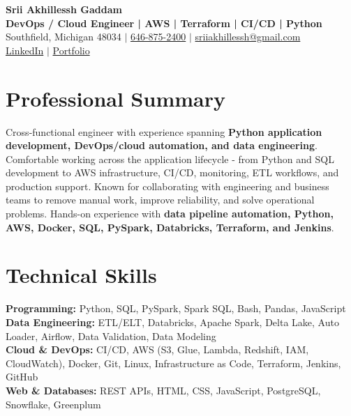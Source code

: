 \documentclass[letterpaper,10pt]{article}
\begin{document}
\fontsize{9.35pt}{10.45pt}\selectfont

\begin{center}
    {\LARGE \textbf{Srii Akhillessh Gaddam}} \\[-1pt]
    \textbf{DevOps / Cloud Engineer | AWS | Terraform | CI/CD | Python} \\[2pt]
    Southfield, Michigan 48034 $|$
    \href{tel:6468752400}{646-875-2400} $|$
    \href{mailto:sriiakhillessh@gmail.com}{sriiakhillessh@gmail.com} \\[1pt]
    \href{https://www.linkedin.com/in/srii-akhiilessh-gaddam-b48668191/}{LinkedIn} $|$
    \href{https://sriiakhillesshg.github.io/portfolio/}{Portfolio}
\end{center}
\vspace{-8pt}

\section{Professional Summary}
\small{Cross-functional engineer with experience spanning \textbf{Python application development, DevOps/cloud automation, and data engineering}. Comfortable working across the application lifecycle - from Python and SQL development to AWS infrastructure, CI/CD, monitoring, ETL workflows, and production support. Known for collaborating with engineering and business teams to remove manual work, improve reliability, and solve operational problems. Hands-on experience with \textbf{data pipeline automation, Python, AWS, Docker, SQL, PySpark, Databricks, Terraform, and Jenkins}.}

\section{Technical Skills}
\small{
\textbf{Programming:} Python, SQL, PySpark, Spark SQL, Bash, Pandas, JavaScript \\
\textbf{Data Engineering:} ETL/ELT, Databricks, Apache Spark, Delta Lake, Auto Loader, Airflow, Data Validation, Data Modeling \\
\textbf{Cloud \& DevOps:} CI/CD, AWS (S3, Glue, Lambda, Redshift, IAM, CloudWatch), Docker, Git, Linux, Infrastructure as Code, Terraform, Jenkins, GitHub \\
\textbf{Web \& Databases:} REST APIs, HTML, CSS, JavaScript, PostgreSQL, Snowflake, Greenplum
}
\end{document}
